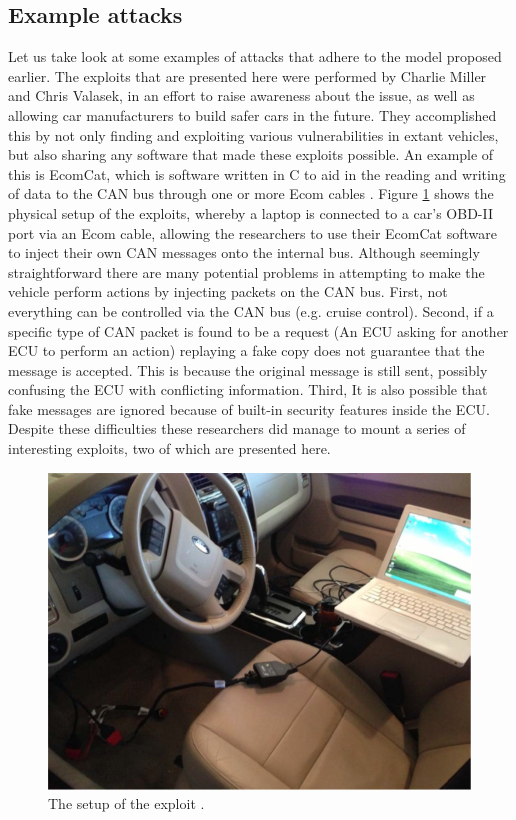 \documentclass[11pt]{article}
\begin{document}
\subsection{Example attacks}
\label{sec:example_attacks}
 Let us take look at some examples of attacks that adhere to the model proposed earlier. The exploits that are presented here were performed by Charlie Miller and Chris Valasek, in an effort to raise awareness about the issue, as well as allowing car manufacturers to build safer cars in the future. They accomplished this by not only finding and exploiting various vulnerabilities in extant vehicles, but also sharing any software that made these exploits possible. An example of this is EcomCat, which is software written in C to aid in the reading and writing of data to the CAN bus through one or more Ecom cables \cite{MillerC}. Figure \ref{fig:exploitsetup} shows the physical setup of the exploits, whereby a laptop is connected to a car's OBD-II port via an Ecom cable, allowing the researchers to use their EcomCat software to inject their own CAN messages onto the internal bus. Although seemingly straightforward there are many potential problems in attempting to make the vehicle perform actions by injecting packets on the CAN bus. First, not everything can be controlled via the CAN bus (e.g. cruise control). Second, if a specific type of CAN packet is found to be a request (An ECU asking for another ECU to perform an action) replaying a fake copy does not guarantee that the message is accepted. This is because the original message is still sent, possibly confusing the ECU with conflicting information. Third, It is also possible that fake messages are ignored because of built-in security features inside the ECU. Despite these difficulties these researchers did manage to mount a series of interesting exploits, two of which are presented here.

\begin{figure}[h]
	\label{fig:exploitsetup}
	\centering
	\includegraphics[width=\textwidth]{ExploitSetup.png}
	\caption{The setup of the exploit \cite{MillerC}.}
\end{figure}
\end{document}
